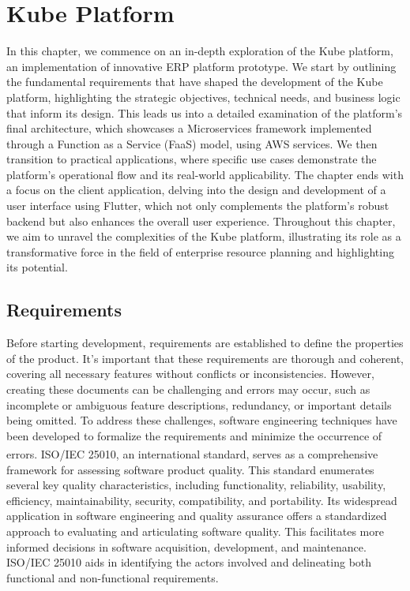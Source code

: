 \chapter{Kube Platform}
In this chapter, we commence on an in-depth exploration of the Kube platform, an implementation of
innovative ERP platform prototype. We start by outlining the fundamental requirements that have
shaped the development of the Kube platform, highlighting the strategic objectives, technical needs,
and business logic that inform its design. This leads us into a detailed examination of the
platform’s final architecture, which showcases a Microservices framework implemented through a
Function as a Service (FaaS) model, using AWS services. We then transition to practical
applications, where specific use cases demonstrate the platform's operational flow and its
real-world applicability. The chapter ends with a focus on the client application, delving into the
design and development of a user interface using Flutter, which not only complements the platform's
robust backend but also enhances the overall user experience. Throughout this chapter, we aim to
unravel the complexities of the Kube platform, illustrating its role as a transformative force in
the field of enterprise resource planning and highlighting its potential.

\section{Requirements}
Before starting development, requirements are established to define the properties of the product.
It's important that these requirements are thorough and coherent, covering all necessary features
without conflicts or inconsistencies. However, creating these documents can be challenging and
errors may occur, such as incomplete or ambiguous feature descriptions, redundancy, or important
details being omitted. To address these challenges, software engineering techniques have been
developed to formalize the requirements and minimize the occurrence of errors.
\newline\newline
ISO/IEC 25010\textsuperscript{\cite{ch5_1}}, an international standard, serves as a comprehensive
framework for assessing software product quality. This standard enumerates several key quality
characteristics, including functionality, reliability, usability, efficiency, maintainability,
security, compatibility, and portability. Its widespread application in software engineering and
quality assurance offers a standardized approach to evaluating and articulating software quality.
This facilitates more informed decisions in software acquisition, development, and maintenance.
ISO/IEC 25010 aids in identifying the actors involved and delineating both functional and
non-functional requirements.

